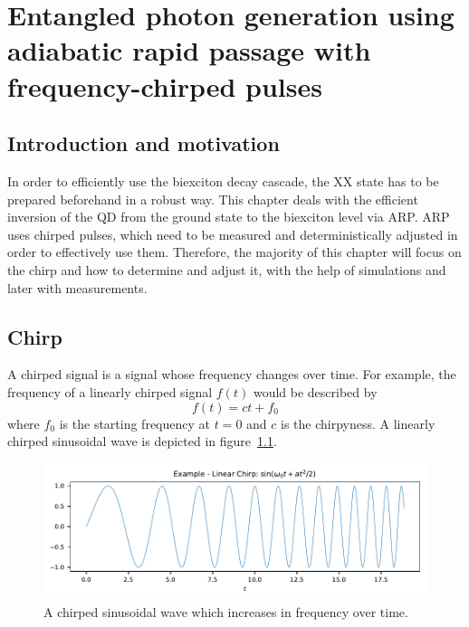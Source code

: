 \chapter{Entangled photon generation using adiabatic rapid passage with frequency-chirped pulses}
\label{cha:chirp}

\section{Introduction and motivation}

In order to efficiently use the biexciton decay cascade, the \acl{XX} state has to be prepared beforehand in a robust way.
This chapter deals with the efficient inversion of the \ac{QD} from the ground state to the biexciton level via \ac{ARP}.
\acs{ARP} uses chirped pulses, which need to be measured and deterministically adjusted in order to effectively use them.
Therefore, the majority of this chapter will focus on the chirp and how to determine and adjust it, with the help of simulations and later with measurements.


\section{Chirp}
\label{sec:chirp}
A chirped signal is a signal whose frequency changes over time.
For example, the frequency of a linearly chirped signal $f(t)$ would be described by
\begin{equation}
f(t) = ct+f_0
\end{equation}
where $f_0$ is the starting frequency at $t=0$ and $c$ is the chirpyness. A linearly chirped sinusoidal wave is depicted in figure~\ref{fig:chirped-sin}.

\begin{figure}[H]
	\centering
	\includegraphics[width=\linewidth]{figures/chirp/plots/chirped-sin}
	\caption{A chirped sinusoidal wave which increases in frequency over time.}
	\label{fig:chirped-sin}
\end{figure}

